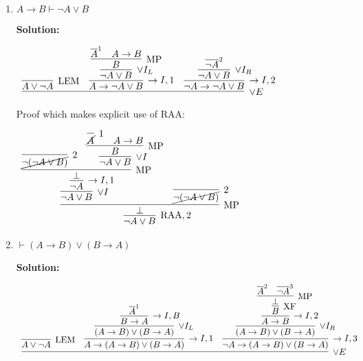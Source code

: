 \documentclass[11pt]{report}
\newcommand{\temp}[2]{{\overline{#2}}^{#1}}
\begin{document}
\begin{enumerate}
\begin{enumerate}
		\item $ A \to  B \vdash  \neg  A \lor  B$  
		
		\textbf{Solution:}

		\begin{center}
			$\begin{array}{c}
				\infer[\lor E]{}
					{\infer[\LEM]{A \lor \lnot A}{}
					&
					\infer[\to I,1]{A \to \lnot A \lor B}
						{\infer[\lor I_{L}]{\lnot A \lor B}
							{\infer[\MP]{B}
								{\temp{1}{A} & A \to B}}}
					&
					\infer[\to I,2]{\lnot A \to \lnot A \lor B}
						{\infer[\lor I_{R}]{\lnot A \lor B}
							{\temp{2}{\lnot A}}}}
			\end{array}$
		\end{center}

		Proof which makes explicit use of RAA: 

		\begin{center}
			$\begin{array}{c}
				\infer[\RAA,2]{\lnot A \lor B}
					{\infer[\MP]{\bot}
						{\infer[\lor I]{\lnot A \lor B}
							{\infer[\to I,1]{\lnot A}
								{\infer[\MP]{\bot}
									{\infer[2]{\cancel{\lnot(\lnot A \lor B)}}{}
									&
									\infer[\lor I]{\lnot A \lor B}
										{\infer[\MP]{B}
											{\infer[1]{\cancel{A}}{}
											&
											A \to B}}}}}
						&
						\infer[2]{\cancel{\lnot(\lnot A \lor B)}}{}}}
			\end{array}$
		\end{center}		
		
		\newpage
		\item $\vdash (A \to B) \lor (B \to A)$
		
		\textbf{Solution:}

		\begin{center}
			$\begin{array}{c}
				\infer[\lor E]{}
					{\infer[\LEM]{A \lor \lnot A}{}
					&
					\infer[\to I,1]{A \to (A \to B) \lor (B \to A)}
						{\infer[\lor I_{L}]{(A \to B) \lor (B \to A)}
							{\infer[\to I, B]{B \to A}
								{\temp{1}{A}}}}
					&
					\infer[\to I,3]{\lnot A \to (A \to B) \lor (B \to A)}
						{\infer[\lor I_{R}]{(A \to B) \lor (B \to A)}
							{\infer[\to I,2]{A \to B}
								{\infer[\XF]{B}
									{\infer[\MP]{\bot}
										{\temp{2}{A}&\temp{3}{\lnot A}}}}}}}
			\end{array}$
		\end{center}


\end{enumerate}
\end{enumerate}
\end{document}
